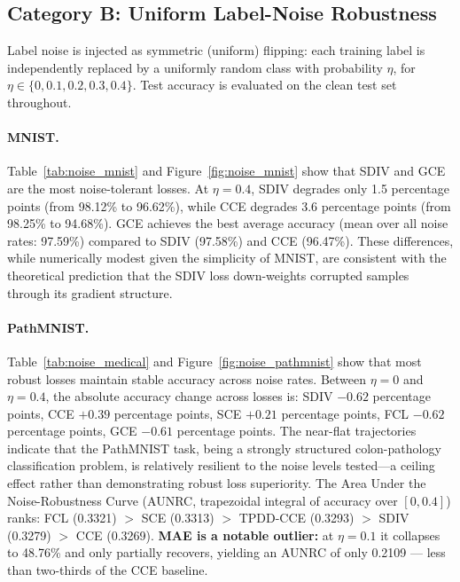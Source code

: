 \subsection{Category B: Uniform Label-Noise Robustness}
\label{sec:noise}

Label noise is injected as symmetric (uniform) flipping: each training label
is independently replaced by a uniformly random class with probability $\eta$,
for $\eta \in \{0, 0.1, 0.2, 0.3, 0.4\}$.
Test accuracy is evaluated on the clean test set throughout.

\paragraph{MNIST.}
Table~\ref{tab:noise_mnist} and Figure~\ref{fig:noise_mnist}
show that SDIV and GCE are the most noise-tolerant losses.
At $\eta{=}0.4$, SDIV degrades only 1.5 percentage points (from 98.12\% to
96.62\%), while CCE degrades 3.6 percentage points (from 98.25\% to 94.68\%).
GCE achieves the best average accuracy (mean over all noise rates: 97.59\%)
compared to SDIV (97.58\%) and CCE (96.47\%).
These differences, while numerically modest given the simplicity of MNIST,
are consistent with the theoretical prediction that the SDIV loss
down-weights corrupted samples through its gradient structure.

\paragraph{PathMNIST.}
Table~\ref{tab:noise_medical} and Figure~\ref{fig:noise_pathmnist} show that
most robust losses maintain stable accuracy across noise rates.
Between $\eta{=}0$ and $\eta{=}0.4$, the absolute accuracy change across
losses is:
SDIV $-0.62$ percentage points, CCE $+0.39$ percentage points,
SCE $+0.21$ percentage points, FCL $-0.62$ percentage points, GCE $-0.61$ percentage points.
The near-flat trajectories indicate that the PathMNIST task, being a strongly
structured colon-pathology classification problem, is relatively resilient to
the noise levels tested---a ceiling effect rather than demonstrating robust
loss superiority.
The Area Under the Noise-Robustness Curve (AUNRC, trapezoidal integral of
accuracy over $[0, 0.4]$) ranks:
FCL (0.3321) $>$ SCE (0.3313) $>$ TPDD-CCE (0.3293) $>$ SDIV (0.3279) $>$ CCE (0.3269).
\textbf{MAE is a notable outlier:} at $\eta{=}0.1$ it collapses to 48.76\%
and only partially recovers, yielding an AUNRC of only 0.2109 ---
less than two-thirds of the CCE baseline.

